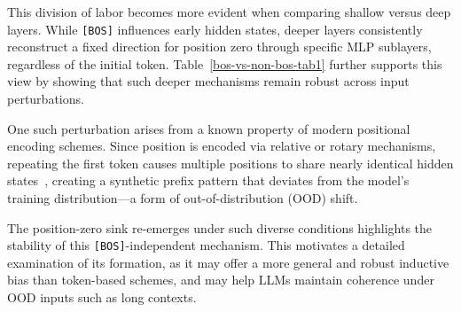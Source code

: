 \documentclass[]{template}
\theoremstyle{plain}
\theoremstyle{definition}
\theoremstyle{remark}
\begin{document}
This division of labor becomes more evident when comparing shallow versus deep layers. While \texttt{[BOS]} influences early hidden states, deeper layers consistently reconstruct a fixed direction for position zero through specific MLP sublayers, regardless of the initial token. Table~\ref{bos-vs-non-bos-tab1} further supports this view by showing that such deeper mechanisms remain robust across input perturbations.

One such perturbation arises from a known property of modern positional encoding schemes. Since position is encoded via relative or rotary mechanisms, repeating the first token causes multiple positions to share nearly identical hidden states~\citep{gu2025attentionsinkemergeslanguage}, creating a synthetic prefix pattern that deviates from the model’s training distribution—a form of out-of-distribution (OOD) shift. 

The position-zero sink re-emerges under such diverse conditions highlights the stability of this \texttt{[BOS]}-independent mechanism.  This motivates a detailed examination of its formation, as it may offer a more general and robust inductive bias than token-based schemes, and may help LLMs maintain coherence under OOD inputs such as long contexts.


\end{document}
